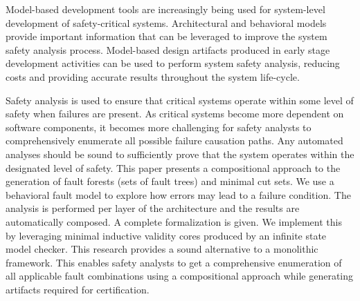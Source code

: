 Model-based development tools are increasingly being used for system-level development of safety-critical systems. Architectural and behavioral models  provide important information that can be leveraged to improve the system safety analysis process. Model-based design artifacts produced in early stage development activities can be used to perform system safety analysis, reducing costs and providing accurate results throughout the system life-cycle.

Safety analysis is used to ensure that critical systems operate within some level of safety when failures are present. As critical systems become more dependent on software components, it becomes more challenging for safety analysts to comprehensively enumerate all possible failure causation paths. Any automated analyses should be sound to sufficiently prove that the system operates within the designated level of safety. This paper presents a compositional approach to the generation of fault forests (sets of fault trees) and minimal cut sets. We use a behavioral fault model to explore how errors may lead to a failure condition. The analysis is performed per layer of the architecture and the results are automatically composed. A complete formalization is given. We implement this by leveraging minimal inductive validity cores produced by an infinite state model checker. This research provides a sound alternative to a monolithic framework. This enables safety analysts to get a comprehensive enumeration of all applicable fault combinations using a compositional approach while generating artifacts required for certification.





